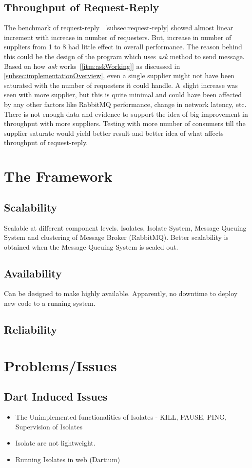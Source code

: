 \subsection{Throughput of Request-Reply}
  The benchmark of request-reply ~\autoref{subsec:request-reply} showed almost linear increment with increase in number of requesters. But, increase in number of suppliers from 1 to 8 had little effect in overall performance. The reason behind this could be the design of the program which uses \emph{ask} method to send message. Based on how \emph{ask} works~[\autoref{itm:askWorking}] as discussed in \autoref{subsec:implementationOverview}, even a single supplier might not have been saturated with the number of requesters it could handle. A slight increase was seen with more supplier, but this is quite minimal and could have been affected by any other factors like RabbitMQ performance, change in network latency, etc. There is not enough data and evidence to support the idea of big improvement in throughput with more suppliers. Testing with more number of consumers till the supplier saturate would yield better result and better idea of what affects throughput of request-reply.


\section{The Framework}

\subsection{Scalability}
    Scalable at different component levels. Isolates, Isolate System, Message Queuing System and clustering of Message Broker (RabbitMQ). Better scalability is obtained when the Message Queuing System is scaled out.

\subsection{Availability}
    Can be designed to make highly available. Apparently, no downtime to deploy new code to a running system.

  \subsection{Reliability}


\section{Problems/Issues}
\subsection{Dart Induced Issues}
  \begin{itemize}
  \item The Unimplemented functionalities of Isolates
    - KILL, PAUSE, PING, Supervision of Isolates
  \item Isolate are not lightweight.
  \item Running Isolates in web (Dartium)
\end{itemize}
